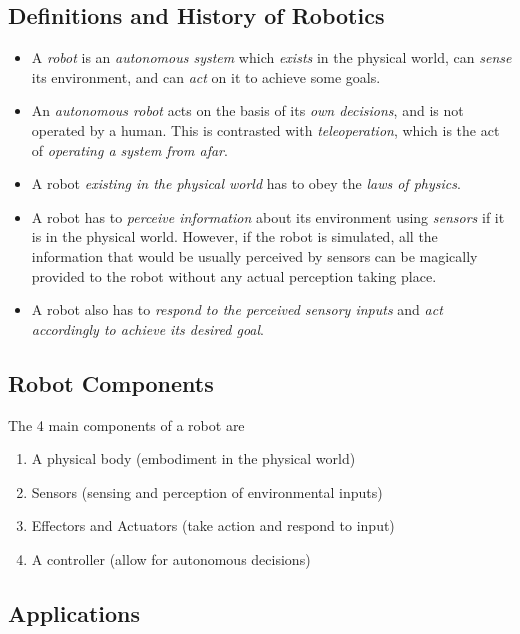 \subsection{Definitions and History of Robotics}
\begin{itemize}
\item A \emph{robot} is an \emph{autonomous system} which \emph{exists} in the physical world, can \emph{sense} its environment, and can \emph{act} on it to achieve some goals.
\item An \emph{autonomous robot} acts on the basis of its \emph{own decisions}, and is not operated by a human. This is contrasted with \emph{teleoperation}, which is the act of \emph{operating a system from afar}.
\item A robot \emph{existing in the physical world} has to obey the \emph{laws of physics}.
\item A robot has to \emph{perceive information} about its environment using \emph{sensors} if it is in the physical world. However, if the robot is simulated, all the information that would be usually perceived by sensors can be magically provided to the robot without any actual perception taking place.
\item A robot also has to \emph{respond to the perceived sensory inputs} and \emph{act accordingly to achieve its desired goal}.
\end{itemize}
\subsection{Robot Components}
The 4 main components of a robot are
\begin{enumerate}
    \item A physical body (embodiment in the physical world)
    \item Sensors (sensing and perception of environmental inputs)
    \item Effectors and Actuators (take action and respond to input)
    \item A controller (allow for autonomous decisions)
\end{enumerate}
\subsection{Applications}
